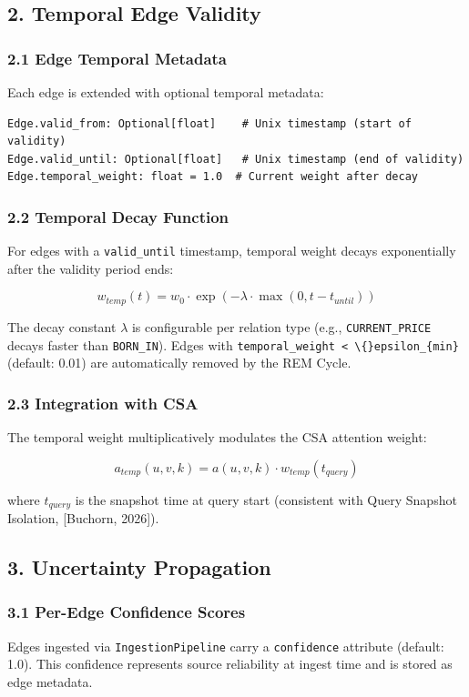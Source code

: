 \subsection*{2. Temporal Edge Validity}

\subsubsection*{2.1 Edge Temporal Metadata}
Each edge is extended with optional temporal metadata:
\begin{lstlisting}
Edge.valid_from: Optional[float]    # Unix timestamp (start of validity)
Edge.valid_until: Optional[float]   # Unix timestamp (end of validity)
Edge.temporal_weight: float = 1.0  # Current weight after decay
\end{lstlisting}

\subsubsection*{2.2 Temporal Decay Function}
For edges with a \texttt{valid\_until} timestamp, temporal weight decays exponentially after the validity period ends:

$$w_{temp}(t) = w_0 \cdot \exp\left(-\lambda \cdot \max(0, t - t_{until})\right)$$

The decay constant $\lambda$ is configurable per relation type (e.g., \texttt{CURRENT\_PRICE} decays faster than \texttt{BORN\_IN}). Edges with \texttt{temporal\_weight < \textbackslash\{\}epsilon\_\{min\}} (default: 0.01) are automatically removed by the REM Cycle.

\subsubsection*{2.3 Integration with CSA}
The temporal weight multiplicatively modulates the CSA attention weight:

$$a_{temp}(u,v,k) = a(u,v,k) \cdot w_{temp}(t_{query})$$

where $t_{query}$ is the snapshot time at query start (consistent with Query Snapshot Isolation, [Buchorn, 2026]).

\subsection*{3. Uncertainty Propagation}

\subsubsection*{3.1 Per-Edge Confidence Scores}
Edges ingested via \texttt{IngestionPipeline} carry a \texttt{confidence} attribute (default: 1.0). This confidence represents source reliability at ingest time and is stored as edge metadata.

